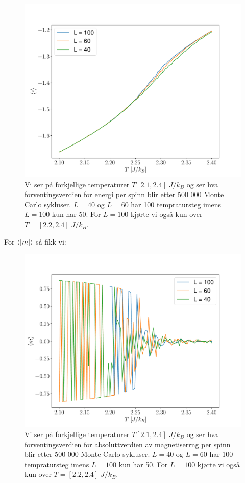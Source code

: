\documentclass[reprint,english,notitlepage]{revtex4-1}  %
\begin{document}
\begin{figure}[H]
\centering
\includegraphics[scale=0.4, trim=2.5cm 0 0 0 ]{../Images/epsPerTAll.pdf}
\caption{Vi ser på forkjellige temperaturer $T [2.1, 2.4] \; J/k_B$ og ser hva forventingsverdien for energi per spinn blir etter 500 000 Monte Carlo sykluser. $L = 40$ og $L = 60$ har 100 tempratursteg imens $L = 100$ kun har 50. For $L = 100$ kjørte vi også kun over $ T = [2.2, 2.4] \; J/k_B$.}
\label{Fig:epsAll}
\end{figure}

For $\expval{|m|}$ så fikk vi:

\begin{figure}[H]
\centering
\includegraphics[scale=0.4, trim=2.5cm 0 0 0 ]{../Images/mPerTAll.pdf}
\caption{Vi ser på forkjellige temperaturer $T [2.1, 2.4] \; J/k_B$ og ser hva forventingsverdien for absoluttverdien av magnetiserrng per spinn blir etter 500 000 Monte Carlo sykluser. $L = 40$ og $L = 60$ har 100 tempratursteg imens $L = 100$ kun har 50. For $L = 100$ kjørte vi også kun over $ T = [2.2, 2.4] \; J/k_B$.}
\label{Fig:mAll}
\end{figure}
\end{document}
